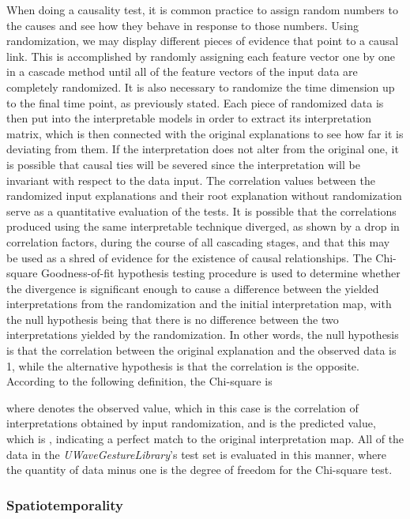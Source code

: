 \documentclass{svproc}
\begin{document}
When doing a causality test, it is common practice to assign random numbers to the causes and see how they behave in response to those numbers. Using randomization, we may display different pieces of evidence that point to a causal link. This is accomplished by randomly assigning each feature vector one by one in a cascade method until all of the feature vectors of the input data are completely randomized. It is also necessary to randomize the time dimension up to the final time point, as previously stated. Each piece of randomized data is then put into the interpretable models in order to extract its interpretation matrix, which is then connected with the original explanations to see how far it is deviating from them. If the interpretation does not alter from the original one, it is possible that causal ties will be severed since the interpretation will be invariant with respect to the data input. The correlation values between the randomized input explanations and their root explanation without randomization serve as a quantitative evaluation of the tests. It is possible that the correlations produced using the same interpretable technique diverged, as shown by a drop in correlation factors, during the course of all cascading stages, and that this may be used as a shred of evidence for the existence of causal relationships. The Chi-square Goodness-of-fit hypothesis testing procedure is used to determine whether the divergence is significant enough to cause a difference between the yielded interpretations from the randomization and the initial interpretation map, with the null hypothesis being that there is no difference between the two interpretations yielded by the randomization. In other words, the null hypothesis is that the correlation between the original explanation and the observed data is 1, while the alternative hypothesis is that the correlation is the opposite. According to the following definition, the Chi-square is

where  denotes the observed value, which in this case is the correlation of interpretations obtained by input randomization, and  is the predicted value, which is , indicating a perfect match to the original interpretation map. All of the data in the \textit{UWaveGestureLibrary}'s test set is evaluated in this manner, where the quantity of data minus one is the degree of freedom for the Chi-square test.

\subsubsection{Spatiotemporality}
\end{document}
